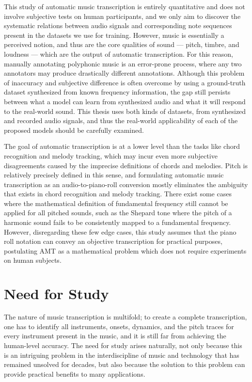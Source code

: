 This study of automatic music transcription is entirely quantitative and does not involve subjective tests on human participants, and we only aim to discover the systematic relations between audio signals and corresponding note sequences present in the datasets we use for training.
However, music is essentially a perceived notion, and thus are the core qualities of sound --- pitch, timbre, and loudness --- which are the output of automatic transcription.
For this reason, manually annotating polyphonic music is an error-prone process, where any two annotators may produce drastically different annotations.
Although this problem of inaccuracy and subjective difference is often overcome by using a ground-truth dataset synthesized from known frequency information, the gap still persists between what a model can learn from synthesized audio and what it will respond to the real-world sound.
This thesis uses both kinds of datasets, from synthesized and recorded audio signals, and thus the real-world applicability of each of the proposed models should be carefully examined.

The goal of automatic transcription is at a lower level than the tasks like chord recognition and melody tracking, which may incur even more subjective disagreements caused by the imprecise definitions of chords and melodies.
Pitch is relatively precisely defined in this sense, and formulating automatic music transcription as an audio-to-piano-roll conversion mostly eliminates the ambiguity that exists in chord recognition and melody tracking.
There exist some cases where the mathematical definition of fundamental frequency still cannot be applied for all pitched sounds, such as the Shepard tone \cite{shepard1964circularity} where the pitch of a harmonic sound fails to be consistently mapped to a fundamental frequency.
However, disregarding these few edge cases, this study assumes that the piano roll notation can convey an objective transcription for practical purposes, postulating AMT as a mathematical problem which does not require experiments on human subjects.

\section{Need for Study}

The nature of music transcription is multifold; to create a complete transcription, one has to identify all instruments, onsets, dynamics, and the pitch traces for every instrument present in the music, and it is still far from achieving the human-level accuracy.
The need for study arises naturally, not only because this is an intriguing problem in the interdiscipline of music and technology that has remained unsolved for decades, but also because the solution to this problem can provide practical benefits to many applications.

